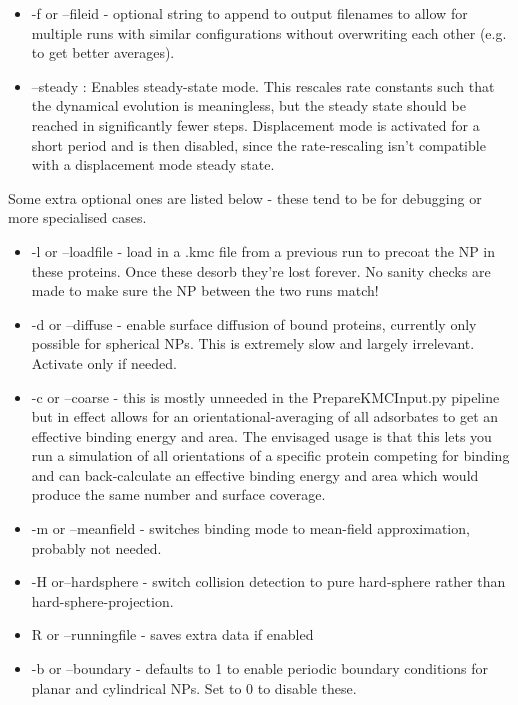 \documentclass[10pt,a4paper,onecolumn]{report}
\begin{document}
\begin{itemize}
\item -f or --fileid - optional string to append to output filenames to allow for multiple runs with similar configurations without overwriting each other (e.g. to get better averages).
\item --steady : Enables steady-state mode. This rescales rate constants such that the dynamical evolution is meaningless, but the steady state should be reached in significantly fewer steps. Displacement mode is activated for a short period and is then disabled, since the rate-rescaling isn't compatible with a displacement mode steady state.
\end{itemize}

Some extra optional ones are listed below - these tend to be for debugging or more specialised cases.
 
 \begin{itemize}
\item -l or --loadfile - load in a .kmc file from a previous run to precoat the NP in these proteins. Once these desorb they're lost forever. No sanity checks are made to make sure the NP between the two runs match!
\item -d or --diffuse - enable surface diffusion of bound proteins, currently only possible for spherical NPs. This is extremely slow and largely irrelevant. Activate only if needed.
\item -c or --coarse - this is mostly unneeded in the PrepareKMCInput.py pipeline but in effect allows for an orientational-averaging of all adsorbates to get an effective binding energy and area. The envisaged usage is that this lets you run a simulation of all orientations of a specific protein competing for binding and can back-calculate an effective binding energy and area which would produce the same number and surface coverage.
\item -m or --meanfield - switches binding mode to mean-field approximation, probably not needed.
\item  -H or--hardsphere - switch collision detection to pure hard-sphere rather than hard-sphere-projection.
\item  R or --runningfile - saves extra data if enabled
\item -b or --boundary - defaults to 1 to enable periodic boundary conditions for planar and cylindrical NPs. Set to 0 to disable these. 
\end{itemize}
\end{document}
